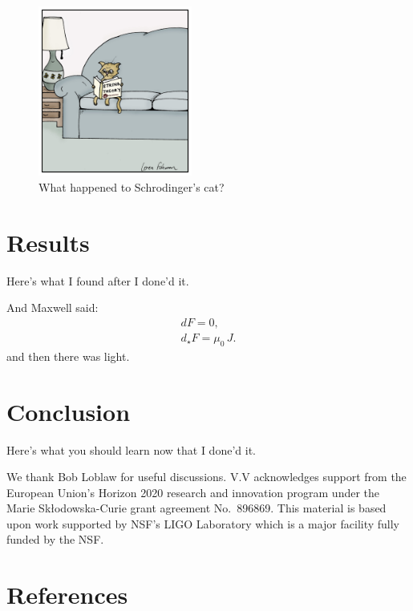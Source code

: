 \documentclass[aps,prd,amsmath,floats,floatfix, twocolumn,
superscriptaddress,nofootinbib,showpacs]{revtex4-1}
\begin{document}
\begin{figure}[thb]
\includegraphics[width=0.45\textwidth]{string_cat.jpeg}
\caption{
What happened to Schrodinger's cat?
}
\label{fig:strings}
\end{figure}

\section{Results}
\label{sec:results}
Here's what I found after I done'd it.

And Maxwell said:
\begin{gather}
    dF = 0, \\
    d_{\star}F = \mu_0 \, J.
\label{eq:doppler_mass}
\end{gather}
and then there was light.


\section{Conclusion}
\label{sec:conclusion}
Here's what you should learn now that I done'd it.


\begin{acknowledgments}
We thank Bob Loblaw for useful discussions.
V.V acknowledges support from the European Union’s Horizon 2020 research and
innovation program under the Marie Skłodowska-Curie grant agreement No.~896869.
This material is based upon work supported by NSF's LIGO Laboratory which is a
major facility fully funded by the NSF.
\end{acknowledgments}

\section*{References}

\end{document}
